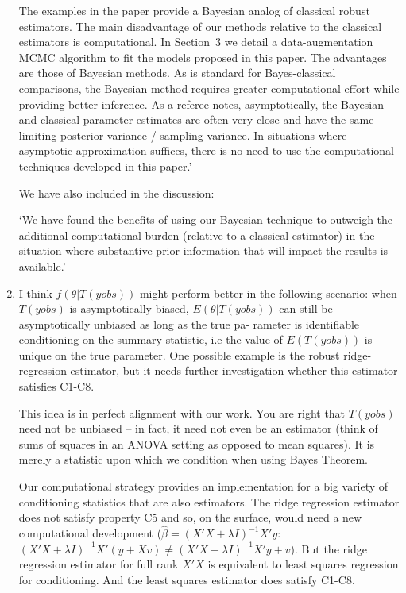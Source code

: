 \documentclass{article}
\newcommand{\response}[1]{{\color{blue}#1}}
\begin{document}
\begin{enumerate}
\response{The examples in the paper provide a Bayesian analog of classical robust estimators.  The main disadvantage of our methods relative to the classical estimators is computational.  In Section~3 we detail a data-augmentation MCMC algorithm to fit the models proposed in this paper.  The advantages are those of Bayesian methods.  As is standard for Bayes-classical comparisons, the Bayesian method requires greater computational effort while providing better inference.  As a referee notes, asymptotically, the Bayesian and classical parameter estimates are often very close and have the same limiting posterior variance / sampling variance.  In situations where asymptotic approximation suffices, there is no need to use the computational techniques developed in this paper.'}


\response{We have also included in the discussion:

`We have found the benefits of using our Bayesian technique to outweigh the additional computational burden (relative to a classical estimator) in the situation where substantive prior information that will impact the results is available.'
}



\item I think $f(\theta|T(yobs))$ might perform better in the following scenario: when $T(yobs)$ is asymptotically biased, $E(\theta|T(yobs))$ can still be asymptotically unbiased as long as the true pa- rameter is identifiable conditioning on the summary statistic, i.e the value of $E(T(yobs))$ is unique on the true parameter. One possible example is the robust ridge-regression estimator, but it needs further investigation whether this estimator satisfies C1-C8.

\response{This idea is in perfect alignment with our work.  You are right that $T(yobs)$ need not be unbiased -- in fact, it need not even be an estimator (think of sums of squares in an ANOVA setting as opposed to mean squares).  It is merely a statistic upon which we condition when using Bayes Theorem.  

Our computational strategy provides an implementation for a big variety of conditioning statistics that are also estimators.  The ridge regression estimator does not satisfy property C5 and so, on the surface, would need a new computational development ($\hat\beta = (X'X +\lambda I)^{-1} X'y$:   $(X'X +\lambda I)^{-1} X'(y + Xv) \neq (X'X +\lambda I)^{-1} X'y + v$). But the ridge regression estimator for full rank $X'X$ is equivalent to least squares regression for conditioning.  And the least squares estimator does satisfy C1-C8.  

}
\end{enumerate}
\end{document}

